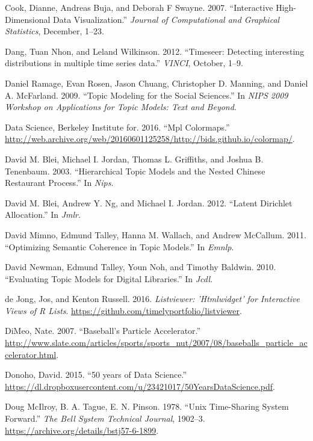 \documentclass[12pt,]{isuthesis}
\begin{document}
\hypertarget{ref-Cook:2007uk}{}
Cook, Dianne, Andreas Buja, and Deborah F Swayne. 2007. ``Interactive
High-Dimensional Data Visualization.'' \emph{Journal of Computational
and Graphical Statistics}, December, 1--23.

\hypertarget{ref-Wilkinson:2012}{}
Dang, Tuan Nhon, and Leland Wilkinson. 2012. ``Timeseer: Detecting
interesting distributions in multiple time series data.'' \emph{VINCI},
October, 1--9.

\hypertarget{ref-Ramage}{}
Daniel Ramage, Evan Rosen, Jason Chuang, Christopher D. Manning, and
Daniel A. McFarland. 2009. ``Topic Modeling for the Social Sciences.''
In \emph{NIPS 2009 Workshop on Applications for Topic Models: Text and
Beyond}.

\hypertarget{ref-viridis}{}
Data Science, Berkeley Institute for. 2016. ``Mpl Colormaps.''
\url{http://web.archive.org/web/20160601125258/http://bids.github.io/colormap/}.

\hypertarget{ref-Blei-hierarchical}{}
David M. Blei, Michael I. Jordan, Thomas L. Griffiths, and Joshua B.
Tenenbaum. 2003. ``Hierarchical Topic Models and the Nested Chinese
Restaurant Process.'' In \emph{Nips}.

\hypertarget{ref-Blei-2003}{}
David M. Blei, Andrew Y. Ng, and Michael I. Jordan. 2012. ``Latent
Dirichlet Allocation.'' In \emph{Jmlr}.

\hypertarget{ref-Mimno}{}
David Mimno, Edmund Talley, Hanna M. Wallach, and Andrew McCallum. 2011.
``Optimizing Semantic Coherence in Topic Models.'' In \emph{Emnlp}.

\hypertarget{ref-Newman-JCDL}{}
David Newman, Edmund Talley, Youn Noh, and Timothy Baldwin. 2010.
``Evaluating Topic Models for Digital Libraries.'' In \emph{Jcdl}.

\hypertarget{ref-listviewer}{}
de Jong, Jos, and Kenton Russell. 2016. \emph{Listviewer: 'Htmlwidget'
for Interactive Views of R Lists}.
\url{https://github.com/timelyportfolio/listviewer}.

\hypertarget{ref-slate}{}
DiMeo, Nate. 2007. ``Baseball's Particle Accelerator.''
\url{http://www.slate.com/articles/sports/sports_nut/2007/08/baseballs_particle_accelerator.html}.

\hypertarget{ref-Donoho:2015tu}{}
Donoho, David. 2015. ``50 years of Data Science.''
\url{https://dl.dropboxusercontent.com/u/23421017/50YearsDataScience.pdf}.

\hypertarget{ref-unix}{}
Doug McIlroy, B. A. Tague, E. N. Pinson. 1978. ``Unix Time-Sharing
System Forward.'' \emph{The Bell System Technical Journal}, 1902--3.
\url{https://archive.org/details/bstj57-6-1899}.
\end{document}
